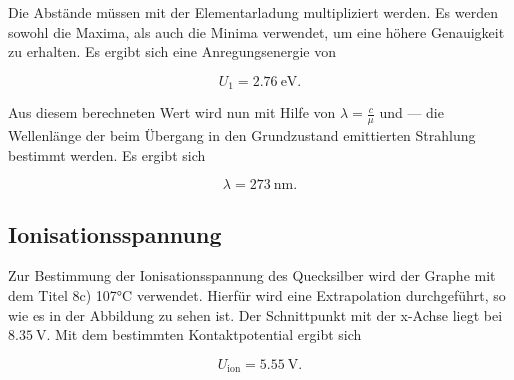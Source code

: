 Die Abstände müssen mit der Elementarladung multipliziert werden. Es werden sowohl die Maxima, 
als auch die Minima verwendet, um eine höhere Genauigkeit zu erhalten. Es ergibt sich eine 
Anregungsenergie von 

\begin{equation*}
U_1 = \SI{2.76}{\eV}.
\end{equation*}

Aus diesem berechneten Wert wird nun mit Hilfe von $\lambda = \frac{c}{\mu}$ und --- die Wellenlänge
der beim Übergang in den Grundzustand emittierten Strahlung bestimmt werden. Es ergibt sich

\begin{equation*}
\lambda = \SI{273}{\nano\meter}.
\end{equation*}

\subsection{Ionisationsspannung}

Zur Bestimmung der Ionisationsspannung des Quecksilber wird der Graphe mit dem Titel 8c) 107°C verwendet. 
Hierfür wird eine Extrapolation durchgeführt, so wie es in der Abbildung zu sehen ist. Der Schnittpunkt mit 
der x-Achse liegt bei $\SI{8.35}{\volt}$. Mit dem bestimmten Kontaktpotential ergibt sich

\begin{equation*}
U_\text{ion} = \SI{5.55}{\volt}.
\end{equation*}

